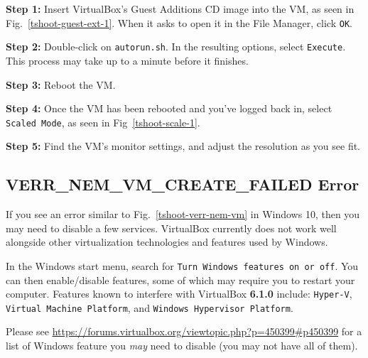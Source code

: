 \documentclass[11pt]{article}
\begin{document}
\textbf{Step 1:} Insert VirtualBox's Guest Additions CD image into the VM, as seen in Fig.~\ref{tshoot-guest-ext-1}. When it asks to open it in the File Manager, click \texttt{OK}.

\textbf{Step 2:} Double-click on \texttt{autorun.sh}. In the resulting options, select \texttt{Execute}. This process may take up to a minute before it finishes.

\textbf{Step 3:} Reboot the VM.

\textbf{Step 4:} Once the VM has been rebooted and you've logged back in, select \texttt{Scaled Mode}, as seen in Fig~\ref{tshoot-scale-1}. 

\textbf{Step 5:} Find the VM's monitor settings, and adjust the resolution as you see fit.


\subsection{VERR\_NEM\_VM\_CREATE\_FAILED Error}
If you see an error similar to Fig.~\ref{tshoot-verr-nem-vm} in Windows 10, then you may need to disable a few services. VirtualBox currently does not work well alongside other virtualization technologies and features used by Windows.

In the Windows start menu, search for \texttt{Turn Windows features on or off}. You can then enable/disable features, some of which may require you to restart your computer. Features known to interfere with VirtualBox \textbf{6.1.0} include: \texttt{Hyper-V}, \texttt{Virtual Machine Platform}, and \texttt{Windows Hypervisor Platform}.

Please see \url{https://forums.virtualbox.org/viewtopic.php?p=450399#p450399} for a list of Windows feature you \textit{may} need to disable (you may not have all of them).

\end{document}

